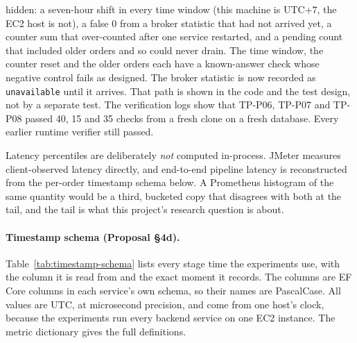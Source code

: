 \documentclass[a4paper]{report}
\begin{document}
hidden: a seven-hour shift in every time window (this machine is UTC+7, the
EC2 host is not), a false 0 from a broker statistic that had not arrived yet,
a counter sum that over-counted after one service restarted, and a pending
count that included older orders and so could never drain. The time window,
the counter reset and the older orders each have a known-answer check whose
negative control fails as designed. The broker statistic is now recorded as
\texttt{unavailable} until it arrives. That path is shown in the code and the
test design, not by a separate test. The verification logs show that
TP-P06, TP-P07 and TP-P08 passed 40, 15 and 35 checks from a fresh clone on
a fresh database. Every earlier runtime verifier still passed.

Latency percentiles are deliberately \emph{not} computed in-process. JMeter
measures client-observed latency directly, and end-to-end pipeline latency is
reconstructed from the per-order timestamp schema below. A Prometheus
histogram of the same quantity would be a third, bucketed copy that disagrees
with both at the tail, and the tail is what this project's research question
is about.

\paragraph{Timestamp schema (Proposal §4d).} Table~\ref{tab:timestamp-schema}
lists every stage time the experiments use, with the column it is read from
and the exact moment it records. The columns are EF Core columns in each
service's own schema, so their names are PascalCase. All values are UTC, at
microsecond precision, and come from one host's clock, because the
experiments run every backend service on one EC2 instance.
The metric dictionary gives the full definitions.
\end{document}
